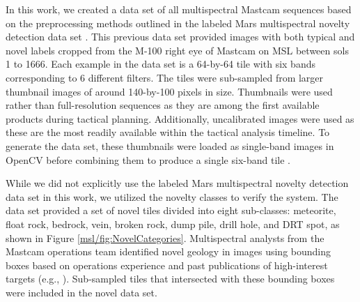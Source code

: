 In this work, we created a data set of all multispectral Mastcam sequences based on the preprocessing methods outlined in the labeled Mars multispectral novelty detection data set \parencite{kerner_data}.
This previous data set provided images with both typical and novel labels cropped from the M-100 right eye of Mastcam on MSL between sols 1 to 1666.
Each example in the data set is a 64-by-64 tile with six bands corresponding to 6 different filters.
The tiles were sub-sampled from larger thumbnail images of around 140-by-100 pixels in size. 
Thumbnails were used rather than full-resolution sequences as they are among the first available products during tactical planning. 
Additionally, uncalibrated images were used as these are the most readily available within the tactical analysis timeline. 
To generate the data set, these thumbnails were loaded as single-band images in OpenCV before combining them to produce a single six-band tile \parencite{opencv_library}.

While we did not explicitly use the labeled Mars multispectral novelty detection data set in this work, we utilized the novelty classes to verify the system.
The data set provided a set of novel tiles divided into eight sub-classes: meteorite, float rock, bedrock, vein, broken rock, dump pile, drill hole, and DRT spot, as shown in Figure \ref{msl/fig:NovelCategories}. 
Multispectral analysts from the Mastcam operations team identified novel geology in images using bounding boxes based on operations experience and past publications of high-interest targets (e.g., \cite{wellington2017visible}).
Sub-sampled tiles that intersected with these bounding boxes were included in the novel data set.

